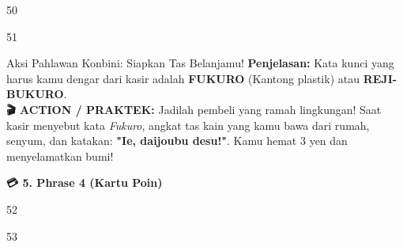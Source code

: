 \begin{convobox}{50}
    \noindent
     

    \vspace{1.5em}
\end{convobox}

\begin{convobox}{51}
    \noindent
      

    \vspace{1.5em}
\end{convobox}

\begin{lessonbox}{Aksi Pahlawan Konbini: Siapkan Tas Belanjamu!}
    \textbf{Penjelasan:} Kata kunci yang harus kamu dengar dari kasir adalah \textbf{FUKURO} (Kantong plastik) atau \textbf{REJI-BUKURO}.
    \\
    \textbf{🎬 ACTION / PRAKTEK:} 
    Jadilah pembeli yang ramah lingkungan! Saat kasir menyebut kata \textit{Fukuro}, angkat tas kain yang kamu bawa dari rumah, senyum, dan katakan: \textbf{"Ie, daijoubu desu!"}. Kamu hemat 3 yen dan menyelamatkan bumi! 
\end{lessonbox}

\vspace{2em}
\begin{tcolorbox}[colback=boxframe, colframe=boxframe, rounded corners, boxrule=0pt, arc=3mm, left=2mm, top=2mm, bottom=2mm]
    \Large \bfseries \color{white} 💳 5. Phrase 4 (Kartu Poin)
\end{tcolorbox}
\vspace{1em}

\begin{convobox}{52}
    \noindent
      

    \vspace{1.5em}
\end{convobox}

\begin{convobox}{53}
    \noindent
      
     

    \vspace{1.5em}
\end{convobox}

